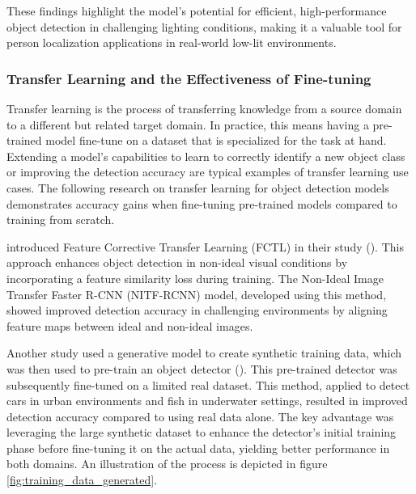 These findings highlight the model's potential for efficient, high-performance object detection in challenging lighting conditions, making it a valuable tool for person localization applications in real-world low-lit environments.

\subsubsection{Transfer Learning and the Effectiveness of Fine-tuning}
\label{sec:transfer_learning_fine_tuning}
Transfer learning is the process of transferring knowledge from a source domain to a different but related target domain. In practice, this means having a pre-trained model fine-tune on a dataset that is specialized for the task at hand. Extending a model's capabilities to learn to correctly identify a new object class or improving the detection accuracy are typical examples of transfer learning use cases. The following research on transfer learning for object detection models demonstrates accuracy gains when fine-tuning pre-trained models compared to training from scratch. 

\citeauthor{Wei2024FeatureCorrective} introduced Feature Corrective Transfer Learning (FCTL) in their study (\citeyear{Wei2024FeatureCorrective}). This approach enhances object detection in non-ideal visual conditions by incorporating a feature similarity loss during training. The Non-Ideal Image Transfer Faster R-CNN (NITF-RCNN) model, developed using this method, showed improved detection accuracy in challenging environments by aligning feature maps between ideal and non-ideal images.

Another study used a generative model to create synthetic training data, which was then used to pre-train an object detector (\cite{TransferLearningGenerative2023}). This pre-trained detector was subsequently fine-tuned on a limited real dataset. This method, applied to detect cars in urban environments and fish in underwater settings, resulted in improved detection accuracy compared to using real data alone. The key advantage was leveraging the large synthetic dataset to enhance the detector's initial training phase before fine-tuning it on the actual data, yielding better performance in both domains. An illustration of the process is depicted in figure \ref{fig:training_data_generated}.

